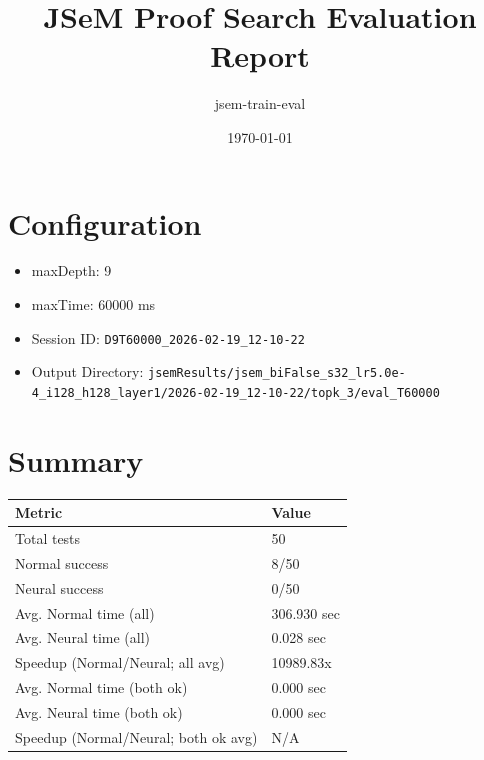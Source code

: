 \documentclass[a4paper,10pt]{article}
\title{JSeM Proof Search Evaluation Report}
\author{jsem-train-eval}
\date{\today}
\begin{document}
\maketitle

\section{Configuration}
\begin{itemize}
\item maxDepth: 9
\item maxTime: 60000 ms
\item Session ID: \texttt{D9T60000\_2026-02-19\_12-10-22}
\item Output Directory: \texttt{jsemResults/jsem\_biFalse\_s32\_lr5.0e-4\_i128\_h128\_layer1/2026-02-19\_12-10-22/topk\_3/eval\_T60000}
\end{itemize}

\section{Summary}
\begin{tabular}{ll}
\toprule
\textbf{Metric} & \textbf{Value} \\
\midrule
Total tests & 50 \\
Normal success & 8/50 \\
Neural success & 0/50 \\
\midrule
Avg. Normal time (all) & 306.930 sec \\
Avg. Neural time (all) & 0.028 sec \\
Speedup (Normal/Neural; all avg) & 10989.83x \\
Avg. Normal time (both ok) & 0.000 sec \\
Avg. Neural time (both ok) & 0.000 sec \\
Speedup (Normal/Neural; both ok avg) & N/A \\
\bottomrule
\end{tabular}
\end{document}
